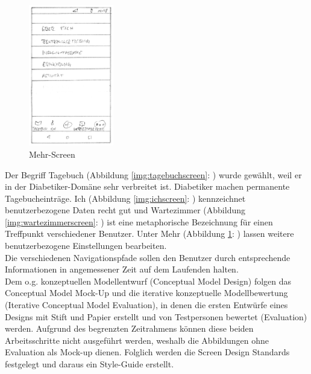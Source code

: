 \begin{figure}[H]
	\centering
	\includegraphics[width=0.33\textwidth]{images/mehrscreen.png}
	\captionsetup{justification=centering}
	\caption{Mehr-Screen}
	\label{img:mehrscreen}
\end{figure}
Der Begriff \glqq Tagebuch\grqq{} (Abbildung \ref{img:tagebuchscreen}: \glqq {}\grqq{}) wurde gewählt, weil er in der Diabetiker-Domäne sehr verbreitet ist. Diabetiker machen permanente \glqq Tagebucheinträge\grqq{}. \glqq Ich\grqq{} (Abbildung \ref{img:ichscreen}: \glqq {}\grqq{}) kennzeichnet benutzerbezogene Daten recht gut und \glqq Wartezimmer\grqq{} (Abbildung \ref{img:wartezimmerscreen}: \glqq {}\grqq{}) ist eine metaphorische Bezeichnung für einen Treffpunkt verschiedener Benutzer. Unter \glqq Mehr\grqq{} (Abbildung \ref{img:mehrscreen}: \glqq {}\grqq{}) lassen weitere benutzerbezogene Einstellungen bearbeiten. \\
Die verschiedenen Navigationspfade sollen den Benutzer durch entsprechende Informationen in angemessener Zeit auf dem Laufenden halten.\\
Dem o.g. konzeptuellen Modellentwurf (Conceptual Model Design) folgen das Conceptual Model Mock-Up und die iterative konzeptuelle Modellbewertung (Iterative Conceptual Model Evaluation), in denen die ersten Entwürfe eines Designs mit Stift und Papier erstellt und von Testpersonen bewertet (Evaluation) werden. Aufgrund des begrenzten Zeitrahmens können diese beiden Arbeitsschritte nicht ausgeführt werden, weshalb die Abbildungen ohne Evaluation als Mock-up dienen. Folglich werden die Screen Design Standards festgelegt und daraus ein Style-Guide erstellt.
